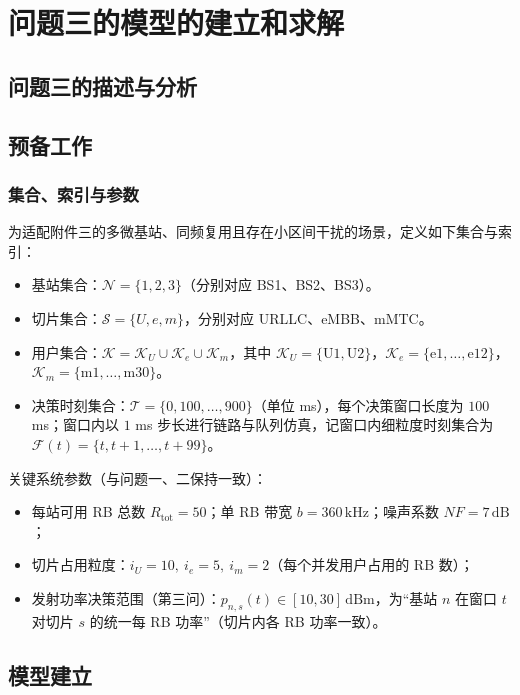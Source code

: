 \section{问题三的模型的建立和求解}
\subsection{问题三的描述与分析}

\subsection{预备工作}


\subsubsection{集合、索引与参数}

为适配附件三的多微基站、同频复用且存在小区间干扰的场景，定义如下集合与索引：

\begin{itemize}
  \item 基站集合：$\mathcal{N}=\{1,2,3\}$（分别对应 BS1、BS2、BS3）。
  \item 切片集合：$\mathcal{S}=\{U,e,m\}$，分别对应 URLLC、eMBB、mMTC。
  \item 用户集合：$\mathcal{K}=\mathcal{K}_U\cup\mathcal{K}_e\cup\mathcal{K}_m$，其中 $\mathcal{K}_U=\{\mathrm{U1},\mathrm{U2}\}$，$\mathcal{K}_e=\{\mathrm{e1},\dots,\mathrm{e12}\}$，$\mathcal{K}_m=\{\mathrm{m1},\dots,\mathrm{m30}\}$。
  \item 决策时刻集合：$\mathcal{T}=\{0,100,\dots,900\}$（单位 ms），每个决策窗口长度为 $100$ ms；窗口内以 $1$ ms 步长进行链路与队列仿真，记窗口内细粒度时刻集合为 $\mathcal{F}(t)=\{t,t+1,\dots,t+99\}$。
\end{itemize}

关键系统参数（与问题一、二保持一致）：

\begin{itemize}
  \item 每站可用 RB 总数 $R_{\text{tot}}=50$；单 RB 带宽 $b=360\,\mathrm{kHz}$；噪声系数 $NF=7\,\mathrm{dB}$；
  \item 切片占用粒度：$i_U=10,\ i_e=5,\ i_m=2$（每个并发用户占用的 RB 数）；
  \item 发射功率决策范围（第三问）：$p_{n,s}(t)\in[10,30]\,\mathrm{dBm}$，为“基站 $n$ 在窗口 $t$ 对切片 $s$ 的统一每 RB 功率”（切片内各 RB 功率一致）。
\end{itemize}

\subsection{模型建立}

